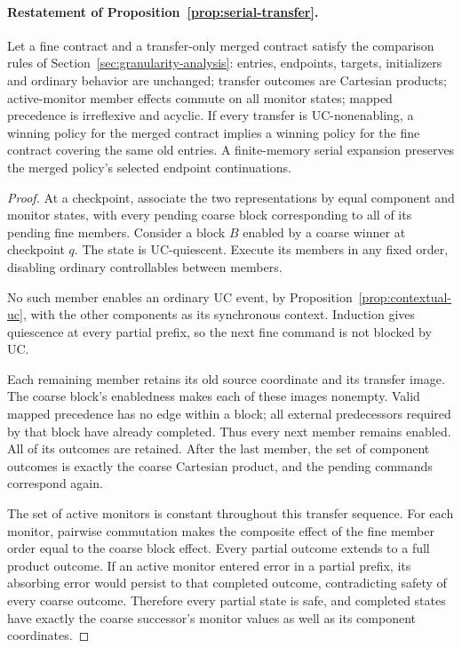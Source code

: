 \paragraph{Restatement of Proposition~\ref{prop:serial-transfer}.}
Let a fine contract and a transfer-only merged contract satisfy the comparison rules of Section~\ref{sec:granularity-analysis}: entries, endpoints, targets, initializers and ordinary behavior are unchanged; transfer outcomes are Cartesian products; active-monitor member effects commute on all monitor states; mapped precedence is irreflexive and acyclic. If every transfer is UC-nonenabling, a winning policy for the merged contract implies a winning policy for the fine contract covering the same old entries. A finite-memory serial expansion preserves the merged policy's selected endpoint continuations.
\begin{proof}
At a checkpoint, associate the two representations by equal component and monitor states, with every pending coarse block corresponding to all of its pending fine members. Consider a block $B$ enabled by a coarse winner at checkpoint $q$. The state is UC-quiescent. Execute its members in any fixed order, disabling ordinary controllables between members.

No such member enables an ordinary UC event, by Proposition~\ref{prop:contextual-uc}, with the other components as its synchronous context. Induction gives quiescence at every partial prefix, so the next fine command is not blocked by UC.

Each remaining member retains its old source coordinate and its transfer image. The coarse block's enabledness makes each of these images nonempty. Valid mapped precedence has no edge within a block; all external predecessors required by that block have already completed. Thus every next member remains enabled. All of its outcomes are retained. After the last member, the set of component outcomes is exactly the coarse Cartesian product, and the pending commands correspond again.

The set of active monitors is constant throughout this transfer sequence. For each monitor, pairwise commutation makes the composite effect of the fine member order equal to the coarse block effect. Every partial outcome extends to a full product outcome. If an active monitor entered error in a partial prefix, its absorbing error would persist to that completed outcome, contradicting safety of every coarse outcome. Therefore every partial state is safe, and completed states have exactly the coarse successor's monitor values as well as its component coordinates.


\end{proof}
